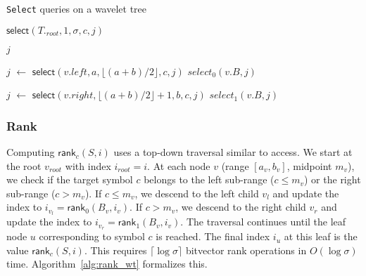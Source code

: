\begin{algorithm}
    \caption{\texttt{Select} queries on a wavelet tree}\label{alg:select_wt}
    \begin{algorithmic}

        \State \Return $\textsf{select}(T._{root},1, \sigma, c, j)$
        \EndFunction



        \State \Return $j$
        \EndIf

        \State $j$ $\gets$ $\textsf{select}(v.left, a, \lfloor (a+b)/2 \rfloor, c, j)$
        \Return $select_0(v.B,j)$

        \Else
        \State $j$ $\gets$ $\textsf{select}(v.right, \lfloor (a+b)/2 \rfloor +1, b, c, j)$
        \State \Return $select_1(v.B,j)$
        \EndIf

        \EndFunction

    \end{algorithmic}
\end{algorithm}

\subsubsection{Rank}
Computing $\textsf{rank}_c(S, i)$ uses a top-down traversal similar to \textsf{access}. We start at the root $v_{root}$ with index $i_{root} = i$. At each node $v$ (range $[a_v, b_v]$, midpoint $m_v$), we check if the target symbol $c$ belongs to the left sub-range ($c \le m_v$) or the right sub-range ($c > m_v$). If $c \le m_v$, we descend to the left child $v_l$ and update the index to $i_{v_l} = \textsf{rank}_0(B_v, i_v)$. If $c > m_v$, we descend to the right child $v_r$ and update the index to $i_{v_r} = \textsf{rank}_1(B_v, i_v)$. The traversal continues until the leaf node $u$ corresponding to symbol $c$ is reached. The final index $i_u$ at this leaf is the value $\textsf{rank}_c(S, i)$. This requires $\lceil \log \sigma \rceil$ bitvector \textsf{rank} operations in $O(\log \sigma)$ time. Algorithm~\ref{alg:rank_wt} formalizes this.

